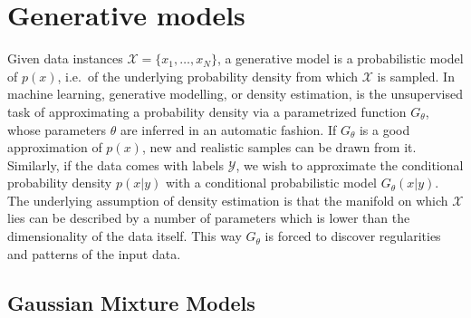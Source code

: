 \section{Generative models}\label{sec:gmm}
Given data instances $\mathcal{X} = \{ x_1, \ldots , x_N \}$, a generative model is a probabilistic model of $p(x)$, i.e.\ of the underlying probability density from which $\mathcal{X}$ is sampled. 
In machine learning, generative modelling, or density estimation, is the unsupervised task of approximating a probability density via a parametrized function $G_{\theta}$, whose parameters $\theta$ are inferred in an automatic fashion. If $G_{\theta}$ is a good approximation of $p(x)$, new and realistic samples can be drawn from it.
Similarly, if the data comes with labels $\mathcal{Y}$, we wish to approximate the conditional probability density $p(x | y)$ with a conditional probabilistic model $G_{\theta}(x | y)$.
The underlying assumption of density estimation is that the manifold on which $\mathcal{X}$ lies can be described by a number of parameters which is lower than the dimensionality of the data itself. This way $G_{\theta}$ 
is forced to discover regularities and patterns of the input data.

\subsection{Gaussian Mixture Models}

